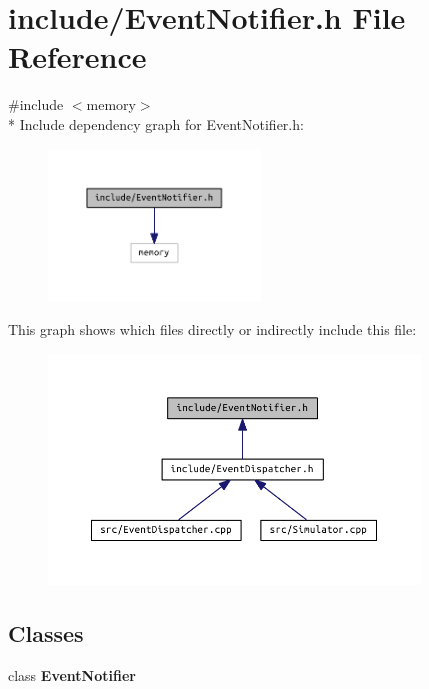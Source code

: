 \section{include/\+Event\+Notifier.h File Reference}
\label{_event_notifier_8h}
{\ttfamily \#include $<$memory$>$}\\*
Include dependency graph for Event\+Notifier.\+h\+:\nopagebreak
\begin{figure}[H]
\begin{center}
\leavevmode
\includegraphics[width=160pt]{_event_notifier_8h__incl}
\end{center}
\end{figure}
This graph shows which files directly or indirectly include this file\+:\nopagebreak
\begin{figure}[H]
\begin{center}
\leavevmode
\includegraphics[width=280pt]{_event_notifier_8h__dep__incl}
\end{center}
\end{figure}
\subsection*{Classes}
\begin{DoxyCompactItemize}
\item 
class {\bf Event\+Notifier}
\end{DoxyCompactItemize}
